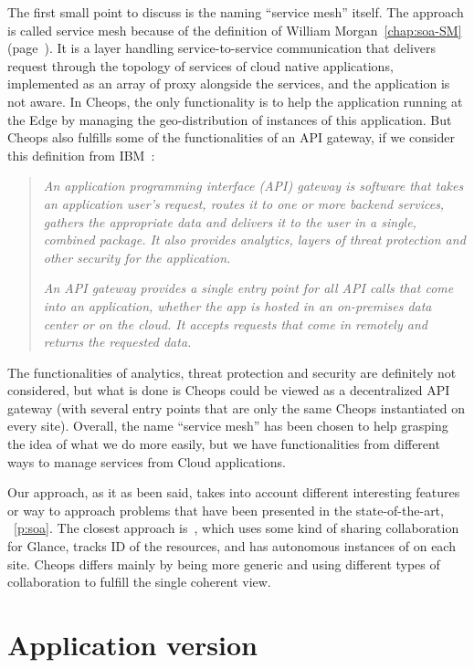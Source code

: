 The first small point to discuss is the naming ``service mesh'' itself.
%
The approach is called service mesh because of the definition of
William Morgan~\autoref{chap:soa-SM} (page~\pageref{chap:soa-SM}).
%
It is a layer handling service-to-service communication that delivers
request through the topology of services of cloud native applications,
implemented as an array of proxy alongside the services, and the
application is not aware.
%
In Cheops, the only functionality is to help the application running
at the Edge by managing the geo-distribution of instances of this
application.
%
But Cheops also fulfills some of the functionalities of an API
gateway, if we consider this definition from IBM~\cite{api-gateway}:
%
\begin{quote}
  \emph{An application programming interface (API) gateway is software
    that takes an application user’s request, routes it to one or more
    backend services, gathers the appropriate data and delivers it to
    the user in a single, combined package. It also provides
    analytics, layers of threat protection and other security for the
    application.}

  \emph{An API gateway provides a single entry point for all API calls that
  come into an application, whether the app is hosted in an
  on-premises data center or on the cloud. It accepts requests that
  come in remotely and returns the requested data.}
\end{quote}
The functionalities of analytics, threat protection and security are
definitely not considered, but what is done is Cheops could be viewed
as a decentralized API gateway (with several entry points that are
only the same Cheops instantiated on every site).
%
Overall, the name ``service mesh'' has been chosen to help grasping
the idea of what we do more easily, but we have functionalities from
different ways to manage services from Cloud applications.


Our approach, as it as been said, takes into account different
interesting features or way to approach problems that have been presented
in the state-of-the-art, ~\autoref{p:soa}.
%
The closest approach is~\cite{MWY+17}, which uses some kind of sharing
collaboration for Glance, tracks ID of the resources, and has
autonomous instances of \os on each site.
%
Cheops differs mainly by being more generic and using different types
of collaboration to fulfill the single coherent view.


\section{Application version}

